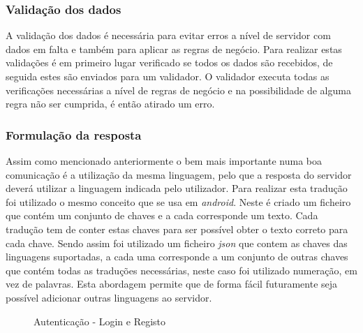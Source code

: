 \subsubsection{Validação dos dados}
A validação dos dados é necessária para evitar erros a nível de servidor com dados em falta e também para aplicar as regras de negócio. Para realizar estas validações é em primeiro lugar verificado se todos os dados são recebidos, de seguida estes são enviados para um validador. O validador executa todas as verificações necessárias a nível de regras de negócio e na possibilidade de alguma regra não ser cumprida, é então atirado um erro.

\subsubsection{Formulação da resposta}
Assim como mencionado anteriormente o bem mais importante numa boa comunicação é a utilização da mesma linguagem, pelo que a resposta do servidor deverá  utilizar a linguagem indicada pelo utilizador. Para realizar esta tradução foi utilizado o mesmo conceito que se usa em \textit{android}. Neste é criado um ficheiro que contém um conjunto de chaves e a cada corresponde um texto. Cada tradução tem de conter estas chaves para ser possível obter o texto correto para cada chave. Sendo assim foi utilizado um ficheiro \textit{json} que contem as chaves das linguagens suportadas, a cada uma corresponde a um conjunto de outras chaves que contém todas as traduções necessárias, neste caso foi utilizado numeração, em vez de palavras. Esta abordagem permite que de forma fácil futuramente seja possível adicionar outras linguagens ao servidor.

\begin{figure}[htb]%
  \centering
  \qquad
  \caption{Autenticação - Login e Registo}%
  \label{fig:24}
\end{figure}

